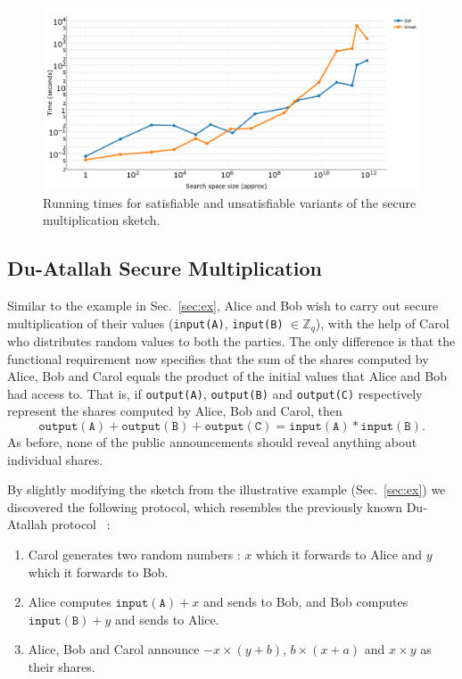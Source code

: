 \documentclass[preprint]{sig-alternate-05-2015}
\begin{document}
\begin{figure}
\centering
\includegraphics[width=\columnwidth]{plot-sec-mult-no-labels.png}
\caption{Running times for satisfiable and unsatisfiable variants of 
the secure multiplication sketch.}
\label{fig:plot-sec-mult}
\end{figure}


\subsection{Du-Atallah Secure Multiplication}

Similar to the example in Sec.~\ref{sec:ex}, 
Alice and Bob wish to carry out secure multiplication of 
their values (\texttt{input(A)}, \texttt{input(B)} $\in \mathbb{Z}_q$),
with the help of Carol who distributes random values to both the parties.
The only difference is that the functional requirement now specifies
that the sum of the shares computed by Alice, Bob 
and Carol equals the product of the initial values 
that Alice and Bob had access to.
That is, if \texttt{output(A)}, \texttt{output(B)} and \texttt{output(C)}
respectively represent the shares computed by Alice, Bob and Carol, then
$$
\mathtt{output(A)} + \mathtt{output(B)} + \mathtt{output(C)} = \mathtt{input(A)}*\mathtt{input(B)}.
$$
As before, none of the public announcements should reveal anything
about individual shares.

By slightly modifying the sketch from the illustrative example 
(Sec.~\ref{sec:ex}) we discovered the following 
protocol, which resembles the previously known Du-Atallah protocol~\cite{DA01} :
\begin{enumerate}\itemsep=0em
    \item Carol generates two random numbers : $x$ which it forwards to Alice
        and $y$ which it forwards to Bob.
    \item Alice computes $\mathtt{input(A)} + x$ and sends to Bob,
        and Bob computes $\mathtt{input(B)} + y$ and sends to Alice.
    \item Alice, Bob and Carol announce $-x\times(y+b)$, $b\times(x+a)$ and 
        $x\times y$ as their shares.
\end{enumerate}
\end{document}
